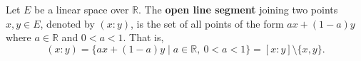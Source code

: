 Let $E$ be a linear space over $\mathbb{R}$. The \textbf{open line segment} joining two points $x, y \in E$, denoted by $(x:y)$, is the set of all points of the form $a x + (1 - a) y$ where $a \in \mathbb{R}$ and $0 < a < 1$. That is,
$$
(x : y) = \{ a x + (1 - a) y \mid a \in \mathbb{R},\ 0 < a < 1 \} = [x : y] \setminus \{x, y\}.
$$
